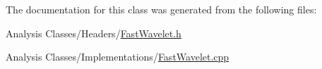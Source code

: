 The documentation for this class was generated from the following files\+:\begin{DoxyCompactItemize}
\item 
Analysis Classes/\+Headers/\hyperlink{_fast_wavelet_8h}{Fast\+Wavelet.\+h}\item 
Analysis Classes/\+Implementations/\hyperlink{_fast_wavelet_8cpp}{Fast\+Wavelet.\+cpp}\end{DoxyCompactItemize}
